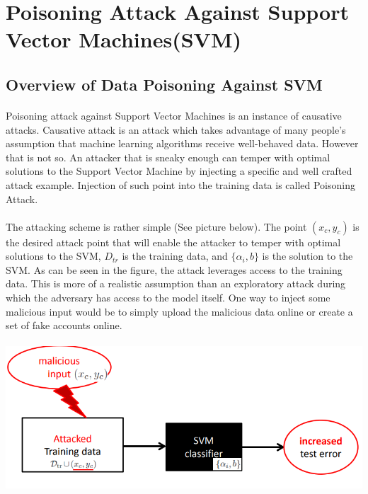 \documentclass[twoside]{article}
\begin{document}
\section{Poisoning Attack Against Support Vector Machines(SVM)}
\subsection {Overview of Data Poisoning Against SVM}
\paragraph{}
Poisoning attack against Support Vector Machines is an instance of causative attacks. Causative attack is an attack which takes advantage of many people's assumption that machine learning algorithms receive well-behaved data. However that is not so. An attacker that is sneaky enough can temper with optimal solutions to the Support Vector Machine by injecting a specific and well crafted attack example. Injection of such point into the training data is called Poisoning Attack.

\paragraph{}
The attacking scheme is rather simple (See picture below). The point $(x_c,y_c)$ is the desired attack point that will enable the attacker to temper with optimal solutions to the SVM, $D_{tr}$ is the training data, and $\{\alpha_i, b\}$ is the solution to the SVM. As can be seen in the figure, the attack leverages access to the training data. This is more of a realistic assumption than an exploratory attack during which the adversary has access to the model itself. One way to inject some malicious input would be to simply upload the malicious data online or create a set of fake accounts online.
\paragraph{}
\includegraphics[scale=0.6]{poisoningpic.PNG}
\end{document}
